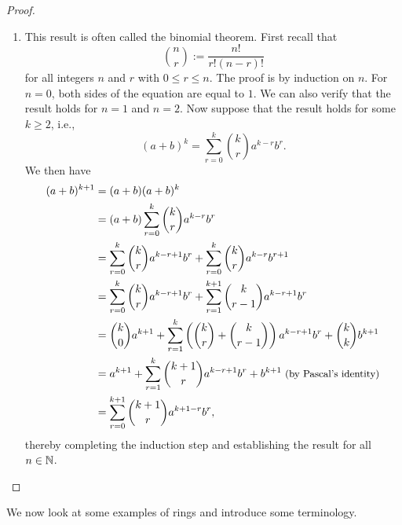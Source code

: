 \begin{proof}
\begin{enumerate}[label=(\alph*), wide]
        \item This result is often called the binomial theorem. First recall
        that
        \[
            \binom{n}{r} := \frac{n!}{r!(n-r)!}
        \]
        for all integers \(n\) and \(r\) with \(0 \leq r \leq n\). The proof is
        by induction on \(n\). For \(n = 0\), both sides of the equation are
        equal to \(1\). We can also verify that the result holds for \(n = 1\)
        and \(n = 2\). Now suppose that the result holds for some \(k \geq 2\),
        i.e.,
        \[
            (a + b)^k = \sum_{r = 0}^{k} \binom{k}{r} a^{k-r} b^r.
        \]
        We then have
        \begin{align*}
            (a + b)^{k+1} &= (a + b)(a + b)^k\\
            &= (a + b)\sum_{r = 0}^{k} \binom{k}{r} a^{k-r} b^r\\
            &= \sum_{r = 0}^{k} \binom{k}{r} a^{k-r+1} b^r + \sum_{r = 0}^{k} \binom{k}{r} a^{k-r} b^{r+1}\\
            &= \sum_{r = 0}^{k} \binom{k}{r} a^{k-r+1} b^r + \sum_{r = 1}^{k+1} \binom{k}{r-1} a^{k-r+1} b^r\\
            &= \binom{k}{0} a^{k+1} + \sum_{r = 1}^{k} \left(\binom{k}{r} + \binom{k}{r-1}\right) a^{k-r+1} b^r + \binom{k}{k} b^{k+1}\\
            &= a^{k+1} + \sum_{r = 1}^{k} \binom{k+1}{r} a^{k-r+1} b^r + b^{k+1} {\small \text{  (by Pascal's identity)}}\\
            &= \sum_{r = 0}^{k+1} \binom{k+1}{r} a^{k+1-r} b^r,
        \end{align*}
        thereby completing the induction step and establishing the result for
        all \(n \in \mathbb{N}\).
    \end{enumerate}
\end{proof}

We now look at some examples of rings and introduce some terminology.

